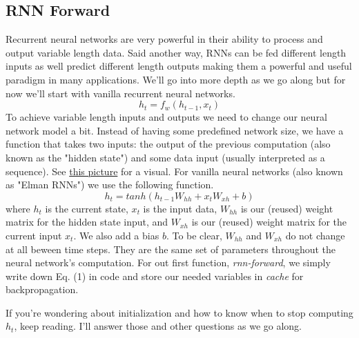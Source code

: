 \documentclass[12pt]{article}
\begin{document}
\subsection{RNN Forward}
Recurrent neural networks are very powerful in their ability to process and output 
variable length data. Said another way, RNNs can be fed different length inputs as 
well predict different length outputs making them a powerful and useful paradigm in 
many applications. We'll go into more depth as we go along but for now we'll start 
with vanilla recurrent neural networks. 
\begin{equation*}
    h_t = f_w (h_{t-1}, x_t)
\end{equation*}
To achieve variable length inputs and outputs we need to change our neural network 
model a bit. Instead of having some predefined network size, we have a function that
takes two inputs: the output of the previous computation (also known as the "hidden state")
and some data input (usually interpreted as a sequence). 
See \href{https://www.google.com/search?q=recurrent+neural+network&sxsrf=ALiCzsaznqUkAxJ_FZnLauL7_6Z3AD132g:1666096199658&source=lnms&tbm=isch&sa=X&ved=2ahUKEwizlpGB5On6AhVtmWoFHfgSCc0Q_AUoAXoECAIQAw&biw=1496&bih=1138&dpr=1.13#imgrc=iC7Ot7uyj4lzoM}
{this picture} for a visual. For vanilla neural networks (also known as "Elman RNNs") 
we use the following function. 
\begin{equation}
    h_t = tanh(h_{t-1}W_{hh} + x_tW_{xh} + b)
\end{equation}
where $h_t$ is the current state, $x_t$ is the input data, $W_{hh}$ is our (reused) 
weight matrix for the hidden state input, and $W_{xh}$ is our (reused) weight 
matrix for the current input $x_t$. We also add a bias $b$. To be clear, $W_{hh}$ and 
$W_{xh}$ do not change at all beween time steps. They are the same set of parameters 
throughout the neural network's computation. For out first function, \emph{rnn-forward}, 
we simply write down Eq. (1) in code and store our needed variables in \emph{cache} 
for backpropagation. 

If you're wondering about initialization and how to know when to stop computing $h_t$, 
keep reading. I'll answer those and other questions as we go along. 
\end{document}
